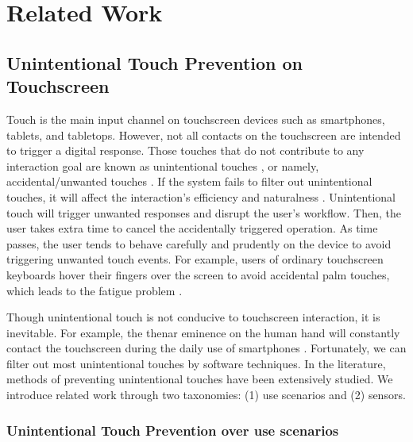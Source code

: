 \section{Related Work}

\subsection{Unintentional Touch Prevention on Touchscreen}

Touch is the main input channel on touchscreen devices such as smartphones, tablets, and tabletops. However, not all contacts on the touchscreen are intended to trigger a digital response. Those touches that do not contribute to any interaction goal are known as unintentional touches \cite{2020-TabletopTouch}, or namely, accidental/unwanted touches \cite{2015-GestureOn,2012-IdentifyUnint}. If the system fails to filter out unintentional touches, it will affect the interaction's efficiency and naturalness \cite{2014-PenMightier, 2020-TabletopTouch}. Unintentional touch will trigger unwanted responses and disrupt the user's workflow. Then, the user takes extra time to cancel the accidentally triggered operation. As time passes, the user tends to behave carefully and prudently on the device to avoid triggering unwanted touch events. For example, users of ordinary touchscreen keyboards hover their fingers over the screen to avoid accidental palm touches, which leads to the fatigue problem \cite{2018-UbiK}.


Though unintentional touch is not conducive to touchscreen interaction, it is inevitable. For example, the thenar eminence on the human hand will constantly contact the touchscreen during the daily use of smartphones \cite{2018-PalmTouch}. Fortunately, we can filter out most unintentional touches by software techniques. In the literature, methods of preventing unintentional touches have been extensively studied. We introduce related work through two taxonomies: (1) use scenarios and (2) sensors.

\subsubsection{Unintentional Touch Prevention over use scenarios}

